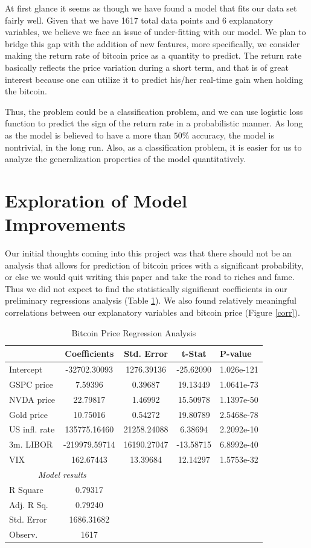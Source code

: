 \documentclass[9pt,twocolumn,twoside]{ilcss}
\begin{document}
At first glance it seems as though we have found a model that fits our data set fairly well. Given that we have 1617 total data points and 6 explanatory variables, we believe we face an issue of under-fitting with our model. We plan to bridge this gap with the addition of new features, more specifically, we consider making the return rate of bitcoin price as a quantity to predict. The return rate basically reflects the price variation during a short term, and that is of great interest because one can utilize it to predict his/her real-time gain when holding the bitcoin. 

Thus, the problem could be a classification problem, and we can use logistic loss function to predict the sign of the return rate in a probabilistic manner. As long as the model is believed to have a more than $50\%$ accuracy, the model is nontrivial, in the long run. Also, as a classification problem, it is easier for us to analyze the generalization properties of the model quantitatively.

\section{Exploration of Model Improvements}
Our initial thoughts coming into this project was that there should not be an analysis that allows for prediction of bitcoin prices with a significant probability, or else we would quit writing this paper and take the road to riches and fame. Thus we did not expect to find the statistically significant coefficients in our preliminary regressions analysis (Table \ref{BTC_Price_reg_analysis}). We also found relatively meaningful correlations between our explanatory variables and bitcoin price (Figure \ref{corr}).

\begin{table}[h]
\centering
\caption{Bitcoin Price Regression Analysis}
\label{BTC_Price_reg_analysis}
\begin{tabular}{@{\extracolsep{0pt}}lcccl} 
\hline
\hline
& Coefficients  & Std. Error  & t-Stat  & P-value\\ 
\hline
Intercept  & -32702.30093 & 1276.39136 & -25.62090 & 1.026e-121\\
GSPC price & 7.59396 & 0.39687 & 19.13449 & 1.0641e-73\\
NVDA price & 22.79817 & 1.46992 & 15.50978 & 1.1397e-50\\
Gold price & 10.75016 & 0.54272 & 19.80789 & 2.5468e-78\\
US infl. rate & 135775.16460 & 21258.24088 & 6.38694 & 2.2092e-10\\
3m. LIBOR & -219979.59714 & 16190.27047 & -13.58715 & 6.8992e-40\\
VIX & 162.67443 & 13.39684 & 12.14297 & 1.5753e-32\\
\hline
\multicolumn{2}{c}{\textit{Model results}}\\
\cline{1-2}
R Square & 0.79317 \\
Adj. R Sq. & 0.79240 \\
Std. Error & 1686.31682 \\
Observ. & 1617 \\
\hline
\end{tabular}
\end{table}
\end{document}
